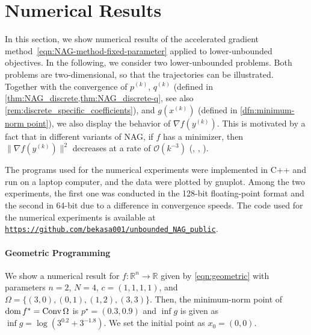 \documentclass[11pt,a4paper]{article}
\theoremstyle{definition}
\theoremstyle{plain}
\newcommand{\RR}{{\mathbb{R}}}
\newcommand{\dom}{\mathop{\rm dom}}
\newcommand{\conv}{\mathop{\rm Conv}}
\begin{document}
\section{Numerical Results}\label{sec:numerical}
In this section, we show numerical results of the accelerated gradient method~\eqref{eqn:NAG-method-fixed-parameter} applied to lower-unbounded objectives.
In the following, we consider two lower-unbounded problems.
Both problems are two-dimensional, so that the trajectories can be illustrated.
Together with the convergence of $p^{(k)}$, $q^{(k)}$ (defined in \cref{thm:NAG_discrete,thm:NAG_discrete-q}, see also \cref{rem:discrete_specific_coefficients}), and $g(x^{(k)})$ (defined in \cref{dfn:minimum-norm point}), we also display the behavior of $\nabla f(y^{(k)})$.
This is motivated by a fact that in different variants of NAG, if $f$ has a minimizer, then $\|\nabla f(y^{(k)})\|^2$ decreases at a rate of $\mathcal{O}(k^{-3})$ (\cite{CSY2022}, \cite[Theorem~2.2.6]{Nesterov2018}, \cite[Theorem~6]{SDJS2022}).

The programs used for the numerical experiments were implemented in C++ and run on a laptop computer, and the data were plotted by gnuplot.
Among the two experiments, the first one was conducted in the 128-bit floating-point format and the second in 64-bit due to a difference in convergence speeds.
The code used for the numerical experiments is available at \href{https://github.com/bekasa001/unbounded_NAG_public}{\nolinkurl{https://github.com/bekasa001/unbounded_NAG_public}}.

\paragraph{Geometric Programming}
We show a numerical result for $f:\RR^n \to \RR$ given by \eqref{eqn:geometric} with parameters $n = 2$, $N = 4$, $c = (1, 1, 1, 1)$, and $\Omega = \{(3, 0), (0, 1), (1, 2), (3, 3)\}$.
Then, the minimum-norm point of $\dom f^\ast = \conv\Omega$ is $p^\star = (0.3, 0.9)$ and $\inf g$ is given as $\inf g = \log \left(3^{0.2} + 3^{-1.8}\right)$.
We set the initial point as $x_0 = (0, 0)$.
\end{document}
